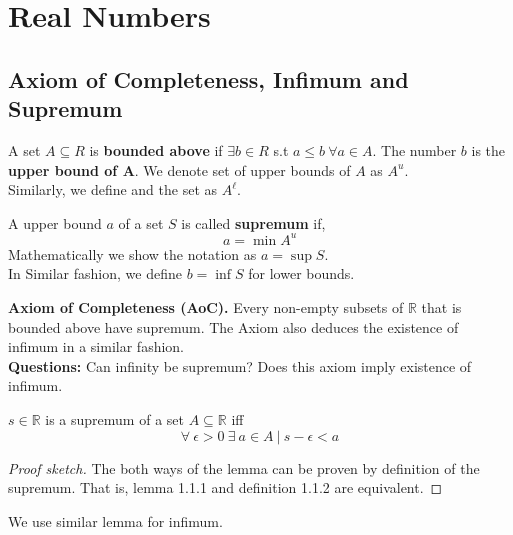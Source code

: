 \chapter{Real Numbers}
\section{Axiom of Completeness, Infimum and Supremum}
\begin{definition}
    A set $A \subseteq R$ is \textbf{bounded above} if $\exists b \in R$ s.t $ a \le b \ \forall a \in A$. The number $b$ is the \textbf{upper bound of  A}. We denote set of upper bounds of $A$ as $A^u$. \\
    Similarly, we define  and the set as $A^{\ell}$.
\end{definition}

\begin{definition} A upper bound $a$ of a set $S$ is called \textbf{supremum} if,
    \[ a = \min A^{u}\]
Mathematically we show the notation as $a = \sup S$.\\ 
In Similar fashion, we define $b = \inf S$ for lower bounds.
\end{definition}
\vspace{6mm}
\textbf{Axiom of Completeness (AoC).} Every non-empty subsets of $\mathbb{R}$ that is bounded above have supremum. The Axiom also deduces the existence of infimum in a similar fashion.\\
\textbf{Questions: } Can infinity be supremum? Does this axiom imply existence of infimum.
\begin{lemma}
    $s \in \mathbb{R}$ is a supremum of a set $A \subseteq \mathbb{R}$ iff 
    \[ \forall \ \epsilon > 0 \ \exists \ a \in A \ | \  s - \epsilon < a\] 
    \begin{proof}[Proof sketch] The both ways of the lemma can be proven by definition of the supremum. That is, lemma 1.1.1 and definition 1.1.2 are equivalent.
    \end{proof}
    We use similar lemma for infimum.
\end{lemma}

